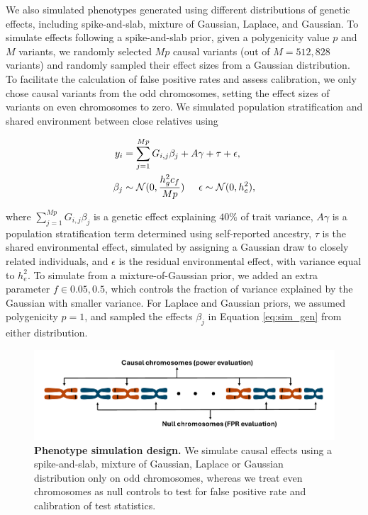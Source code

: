%
We also simulated phenotypes generated using different distributions of genetic effects, including spike-and-slab, mixture of Gaussian, Laplace, and Gaussian.
%
To simulate effects following a spike-and-slab prior, given a polygenicity value $p$ and $M$ variants, we randomly selected $Mp$ causal variants (out of $M = 512,828$ variants) and randomly sampled their effect sizes from a Gaussian distribution. 
%
To facilitate the calculation of false positive rates and assess calibration, we only chose causal variants from the odd chromosomes, setting the effect sizes of variants on even chromosomes to zero.
%
We simulated population stratification and shared environment between close relatives using
%

\begin{align}
    y_i &= \sum\limits_{j=1}^{Mp} G_{i,j}\beta_j + A\gamma + \tau + \epsilon,  \nonumber \\
    \beta_j &\sim \mathcal{N}(0, \frac{h_g^2 c_f}{Mp}) \hspace{5mm} \epsilon \sim \mathcal{N}(0, h_e^2),
\label{eq:sim_gen}
\end{align}


where $\sum\limits_{j=1}^{Mp} G_{i,j}\beta_j$ is a genetic effect explaining $40\%$ of trait variance, $A\gamma$ is a population stratification term determined using self-reported ancestry, $\tau$ is the shared environmental effect, simulated by assigning a Gaussian draw to closely related individuals, and $\epsilon$ is the residual environmental effect, with variance equal to $h^2_e$.
%
To simulate from a mixture-of-Gaussian prior, we added an extra parameter $f \in {0.05, 0.5}$, which controls the fraction of variance explained by the Gaussian with smaller variance.
%
For Laplace and Gaussian priors, we assumed polygenicity $p = 1$, and sampled the effects $\beta_j$ in Equation \ref{eq:sim_gen} from either distribution.
%

\begin{figure}
    \centering
    \includegraphics[width=\linewidth]{figures/thesis_qd_sim_design.pdf}
    \caption{\textbf{Phenotype simulation design.} We simulate causal effects using a spike-and-slab, mixture of Gaussian, Laplace or Gaussian distribution only on odd chromosomes, whereas we treat even chromosomes as null controls to test for false positive rate and calibration of test statistics.}
    \label{fig:qd_sim_design}
\end{figure}

